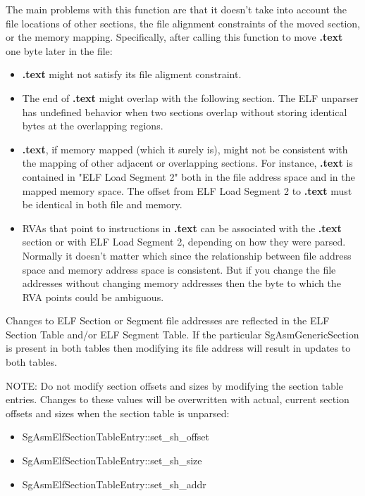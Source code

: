    The main problems with this function are that it doesn't take into account the file locations of other sections, the file
   alignment constraints of the moved section, or the memory mapping. Specifically, after calling this function to move {\bf.text}
   one byte later in the file:
\begin{itemize}
   \item {\bf.text} might not satisfy its file aligment constraint.

   \item The end of {\bf.text} might overlap with the following section. The ELF unparser has undefined behavior when two sections
     overlap without storing identical bytes at the overlapping regions.

   \item {\bf.text}, if memory mapped (which it surely is), might not be consistent with the mapping of other adjacent or overlapping
     sections. For instance, {\bf.text} is contained in "ELF Load Segment 2" both in the file address space and in the mapped
     memory space. The offset from ELF Load Segment 2 to {\bf.text} must be identical in both file and memory.

   \item RVAs that point to instructions in {\bf.text} can be associated with the {\bf.text} section or with ELF Load Segment 2,
     depending on how they were parsed. Normally it doesn't matter which since the relationship between file address space and
     memory address space is consistent. But if you change the file addresses without changing memory addresses then the byte
     to which the RVA points could be ambiguous.
\end{itemize}

   Changes to ELF Section or Segment file addresses are reflected in the ELF Section Table and/or ELF Segment Table. If the
   particular SgAsmGenericSection is present in both tables then modifying its file address will result in updates to both
   tables.

   NOTE: Do not modify section offsets and sizes by modifying the section table entries. Changes to these values will be
   overwritten with actual, current section offsets and sizes when the section table is unparsed:
\begin{itemize}
	\item SgAsmElfSectionTableEntry::set\_sh\_offset
	\item SgAsmElfSectionTableEntry::set\_sh\_size
	\item SgAsmElfSectionTableEntry::set\_sh\_addr
\end{itemize}


